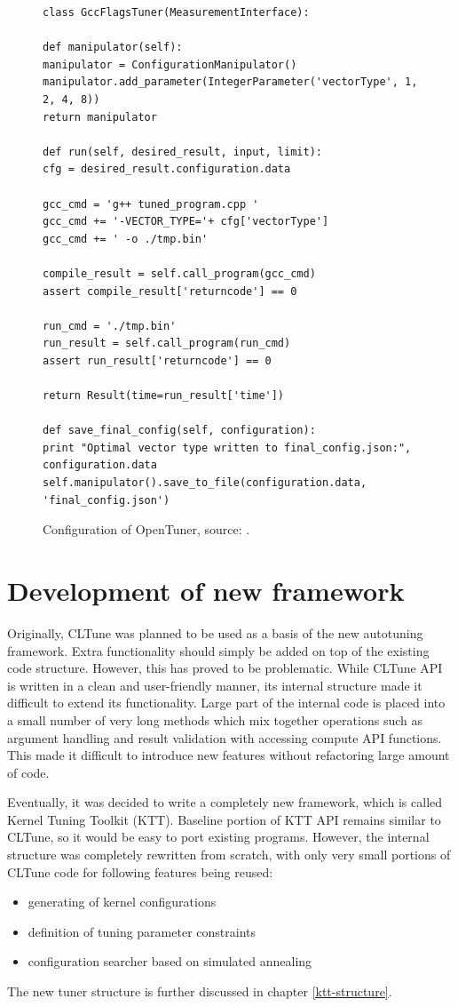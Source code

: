 \documentclass
[
    digital, %
    oneside, %
    table, %
    nolof, %
    nolot, %
    nocover %
]{fithesis3}
\begin{document}
\begin{figure}
\begin{lstlisting}
class GccFlagsTuner(MeasurementInterface):

def manipulator(self):
manipulator = ConfigurationManipulator()
manipulator.add_parameter(IntegerParameter('vectorType', 1, 2, 4, 8))
return manipulator

def run(self, desired_result, input, limit):
cfg = desired_result.configuration.data

gcc_cmd = 'g++ tuned_program.cpp '
gcc_cmd += '-VECTOR_TYPE='+ cfg['vectorType']
gcc_cmd += ' -o ./tmp.bin'

compile_result = self.call_program(gcc_cmd)
assert compile_result['returncode'] == 0

run_cmd = './tmp.bin'
run_result = self.call_program(run_cmd)
assert run_result['returncode'] == 0

return Result(time=run_result['time'])

def save_final_config(self, configuration):
print "Optimal vector type written to final_config.json:", configuration.data
self.manipulator().save_to_file(configuration.data, 'final_config.json')
\end{lstlisting}
\caption{Configuration of OpenTuner, source: \cite{opentuner}.}
\label{opentuner-example}
\end{figure}

\section{Development of new framework}
Originally, CLTune was planned to be used as a basis of the new autotuning framework. Extra functionality should simply be added on top of the
existing code structure. However, this has proved to be problematic. While CLTune API is written in a clean and user-friendly manner, its
internal structure made it difficult to extend its functionality. Large part of the internal code is placed into a small number of very long methods
which mix together operations such as argument handling and result validation with accessing compute API functions. This made it difficult to
introduce new features without refactoring large amount of code.

Eventually, it was decided to write a completely new framework, which is called Kernel Tuning Toolkit (KTT). Baseline portion of KTT API remains
similar to CLTune, so it would be easy to port existing programs. However, the internal structure was completely rewritten from scratch, with only
very small portions of CLTune code for following features being reused:
\begin{itemize}
    \item generating of kernel configurations
    \item definition of tuning parameter constraints
    \item configuration searcher based on simulated annealing
\end{itemize}
The new tuner structure is further discussed in chapter \ref{ktt-structure}.
\end{document}
